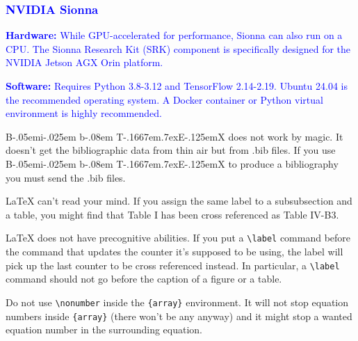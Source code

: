 \documentclass[conference]{IEEEtran}
\def\BibTeX{{\rm B\kern-.05em{\sc i\kern-.025em b}\kern-.08em
    T\kern-.1667em\lower.7ex\hbox{E}\kern-.125emX}}
\begin{document}
\textcolor{blue}{\subsubsection{NVIDIA Sionna}}

\textcolor{blue}{\textbf{Hardware:} While GPU-accelerated for performance, Sionna can also run on a CPU. The Sionna Research Kit (SRK) component is specifically designed for the NVIDIA Jetson AGX Orin platform.}

\textcolor{blue}{\textbf{Software:} Requires Python 3.8-3.12 and TensorFlow 2.14-2.19. Ubuntu 24.04 is the recommended operating system. A Docker container or Python virtual environment is highly recommended.}

{\BibTeX} does not work by magic. It doesn't get the bibliographic
data from thin air but from .bib files. If you use {\BibTeX} to produce a
bibliography you must send the .bib files. 

{\LaTeX} can't read your mind. If you assign the same label to a
subsubsection and a table, you might find that Table I has been cross
referenced as Table IV-B3. 

{\LaTeX} does not have precognitive abilities. If you put a
\verb|\label| command before the command that updates the counter it's
supposed to be using, the label will pick up the last counter to be
cross referenced instead. In particular, a \verb|\label| command
should not go before the caption of a figure or a table.

Do not use \verb|\nonumber| inside the \verb|{array}| environment. It
will not stop equation numbers inside \verb|{array}| (there won't be
any anyway) and it might stop a wanted equation number in the
surrounding equation.
\end{document}
